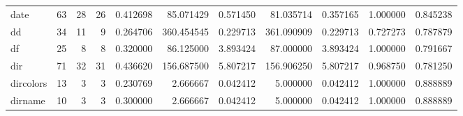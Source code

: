 \begin{tabular}{lrrrrrrrrrr}
date      &                                      63 &                 28 &                                26 &                                   0.412698 &                              85.071429 &                                     0.571450 &                         81.035714 &                                0.357165 &                           1.000000 &                                           0.845238 \\
dd        &                                      34 &                 11 &                                 9 &                                   0.264706 &                             360.454545 &                                     0.229713 &                        361.090909 &                                0.229713 &                           0.727273 &                                           0.787879 \\
df        &                                      25 &                  8 &                                 8 &                                   0.320000 &                              86.125000 &                                     3.893424 &                         87.000000 &                                3.893424 &                           1.000000 &                                           0.791667 \\
dir       &                                      71 &                 32 &                                31 &                                   0.436620 &                             156.687500 &                                     5.807217 &                        156.906250 &                                5.807217 &                           0.968750 &                                           0.781250 \\
dircolors &                                      13 &                  3 &                                 3 &                                   0.230769 &                               2.666667 &                                     0.042412 &                          5.000000 &                                0.042412 &                           1.000000 &                                           0.888889 \\
dirname   &                                      10 &                  3 &                                 3 &                                   0.300000 &                               2.666667 &                                     0.042412 &                          5.000000 &                                0.042412 &                           1.000000 &                                           0.888889 \\

\end{tabular}
